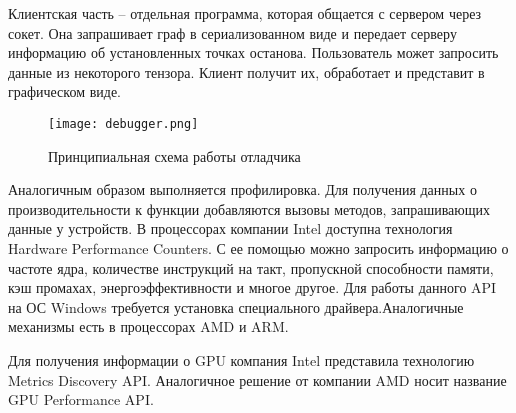 Клиентская часть -- отдельная программа, которая общается с сервером через сокет.
Она запрашивает граф в сериализованном виде и передает серверу информацию об
установленных точках останова. Пользователь может запросить данные из некоторого
тензора. Клиент получит их, обработает и представит в графическом виде.

\begin{figure}[ht]
    \centering
    \texttt{[image: debugger.png]}
    \caption{Принципиальная схема работы отладчика}
    \label{fig:debugger}
\end{figure}

Аналогичным образом выполняется профилировка. Для получения данных о производительности
к функции добавляются вызовы методов, запрашивающих данные у устройств.
В процессорах компании Intel доступна технология Hardware Performance Counters.
С ее помощью можно запросить информацию о частоте ядра, количестве инструкций
на такт, пропускной способности памяти, кэш промахах, энергоэффективности
и многое другое. Для работы данного API на ОС Windows требуется
установка специального драйвера.Аналогичные механизмы есть в процессорах AMD
и ARM.

Для получения информации о GPU компания Intel представила технологию Metrics
Discovery API. Аналогичное решение от компании AMD носит название GPU Performance
API.
